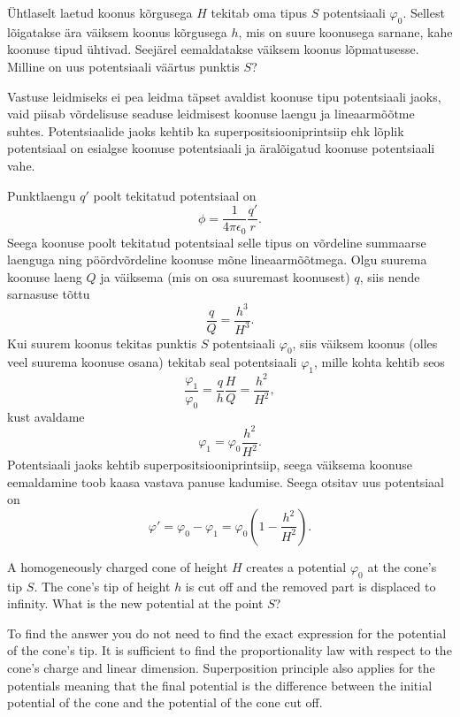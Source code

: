
Ühtlaselt laetud koonus kõrgusega $H$ tekitab oma tipus $S$ potentsiaali
$\varphi_0$. Sellest lõigatakse ära väiksem koonus kõrgusega $h$, mis on suure
koonusega sarnane, kahe koonuse tipud ühtivad. Seejärel eemaldatakse väiksem koonus
lõpmatusesse. Milline on uus potentsiaali väärtus punktis $S$?

\hint
Vastuse leidmiseks ei pea leidma täpset avaldist koonuse tipu potentsiaali jaoks, vaid piisab võrdelisuse seaduse leidmisest koonuse laengu ja lineaarmõõtme suhtes. Potentsiaalide jaoks kehtib ka superpositsiooniprintsiip ehk lõplik potentsiaal on esialgse koonuse potentsiaali ja äralõigatud koonuse potentsiaali vahe.

\solu
Punktlaengu $q'$ poolt tekitatud potentsiaal on
\[
\phi = \frac{1}{4 \pi \epsilon_0} \frac{q'}{r}.
\]
Seega koonuse poolt tekitatud potentsiaal selle tipus on võrdeline summaarse laenguga ning pöördvõrdeline koonuse mõne lineaarmõõtmega. Olgu suurema koonuse laeng $Q$ ja väiksema (mis on osa suuremast koonusest) $q$, siis nende sarnasuse tõttu
\[
\frac{q}{Q} = \frac{h^3}{H^3}.
\]
Kui suurem koonus tekitas punktis $S$ potentsiaali $\varphi_0$, siis väiksem koonus (olles veel suurema koonuse osana) tekitab seal potentsiaali $\varphi_1$, mille kohta kehtib seos
\[
\frac{\varphi_1}{\varphi_0} = \frac{q}{h} \frac{H}{Q} = \frac{h^2}{H^2},
\]
kust avaldame
\[
\varphi_1 = \varphi_0 \frac{h^2}{H^2}.
\]
Potentsiaali jaoks kehtib superpositsiooniprintsiip, seega väiksema koonuse eemaldamine toob kaasa vastava panuse kadumise. Seega otsitav uus potentsiaal on
\[
\varphi' = \varphi_0 - \varphi_1 = \varphi_0 \left( 1 - \frac{h^2}{H^2}\right).
\]

A homogeneously charged cone of height $H$ creates a potential $\varphi_0$ at the cone’s tip $S$. The cone’s tip of height $h$ is cut off and the removed part is displaced to infinity. What is the new potential at the point $S$?

\hinteng
To find the answer you do not need to find the exact expression for the potential of the cone's tip. It is sufficient to find the proportionality law with respect to the cone's charge and linear dimension. Superposition principle also applies for the potentials meaning that the final potential is the difference between the initial potential of the cone and the potential of the cone cut off.


